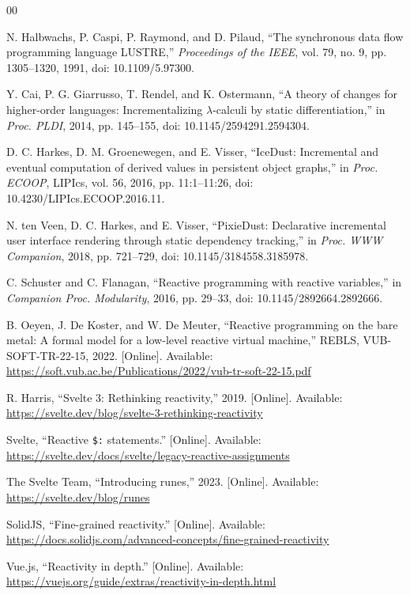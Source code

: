 \documentclass[conference]{IEEEtran}
\begin{document}
\begin{thebibliography}{00}

N. Halbwachs, P. Caspi, P. Raymond, and D. Pilaud,
``The synchronous data flow programming language LUSTRE,''
\emph{Proceedings of the IEEE}, vol. 79, no. 9, pp. 1305--1320, 1991,
doi: 10.1109/5.97300.

Y. Cai, P. G. Giarrusso, T. Rendel, and K. Ostermann,
``A theory of changes for higher-order languages: Incrementalizing
$\lambda$-calculi by static differentiation,'' in \emph{Proc. PLDI}, 2014,
pp. 145--155, doi: 10.1145/2594291.2594304.

D. C. Harkes, D. M. Groenewegen, and E. Visser,
``IceDust: Incremental and eventual computation of derived values in persistent
object graphs,'' in \emph{Proc. ECOOP}, LIPIcs, vol. 56, 2016, pp. 11:1--11:26,
doi: 10.4230/LIPIcs.ECOOP.2016.11.

N. ten Veen, D. C. Harkes, and E. Visser,
``PixieDust: Declarative incremental user interface rendering through static
dependency tracking,'' in \emph{Proc. WWW Companion}, 2018, pp. 721--729,
doi: 10.1145/3184558.3185978.

C. Schuster and C. Flanagan, ``Reactive programming with reactive variables,''
in \emph{Companion Proc. Modularity}, 2016, pp. 29--33,
doi: 10.1145/2892664.2892666.

B. Oeyen, J. De Koster, and W. De Meuter,
``Reactive programming on the bare metal: A formal model for a low-level
reactive virtual machine,'' REBLS, VUB-SOFT-TR-22-15, 2022. [Online]. Available:
\url{https://soft.vub.ac.be/Publications/2022/vub-tr-soft-22-15.pdf}

R. Harris, ``Svelte 3: Rethinking reactivity,'' 2019. [Online]. Available:
\url{https://svelte.dev/blog/svelte-3-rethinking-reactivity}

Svelte, ``Reactive \texttt{\$:} statements.'' [Online]. Available:
\url{https://svelte.dev/docs/svelte/legacy-reactive-assignments}

The Svelte Team, ``Introducing runes,'' 2023. [Online]. Available:
\url{https://svelte.dev/blog/runes}

SolidJS, ``Fine-grained reactivity.'' [Online]. Available:
\url{https://docs.solidjs.com/advanced-concepts/fine-grained-reactivity}

Vue.js, ``Reactivity in depth.'' [Online]. Available:
\url{https://vuejs.org/guide/extras/reactivity-in-depth.html}


\end{thebibliography}
\end{document}
